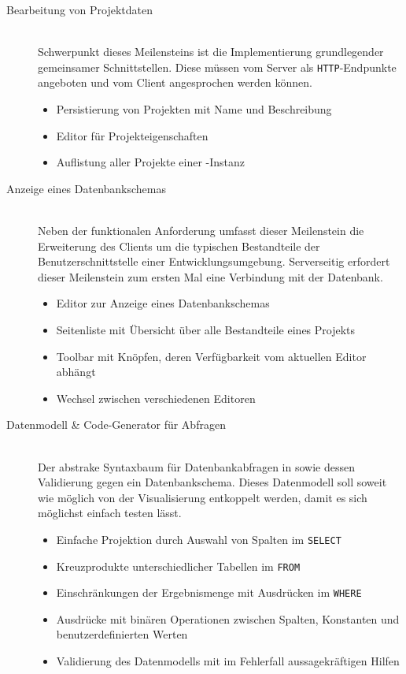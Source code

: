 \begin{description}
\item[Bearbeitung von Projektdaten] \hfill \\
  Schwerpunkt dieses Meilensteins ist die Implementierung grundlegender gemeinsamer Schnittstellen. Diese müssen vom Server als \texttt{HTTP}-Endpunkte angeboten und vom Client angesprochen werden können.
  \begin{itemize}[noitemsep]
  \item Persistierung von Projekten mit Name und Beschreibung
  \item Editor für Projekteigenschaften
  \item Auflistung aller Projekte einer \idename{}-Instanz
  \end{itemize}
  
\item [Anzeige eines Datenbankschemas] \hfill \\
  Neben der funktionalen Anforderung umfasst dieser Meilenstein die Erweiterung des Clients um die typischen Bestandteile der Benutzerschnittstelle einer Entwicklungsumgebung. Serverseitig erfordert dieser Meilenstein zum ersten Mal eine Verbindung mit der Datenbank.
  \begin{itemize}[noitemsep]
  \item Editor zur Anzeige eines Datenbankschemas
  \item Seitenliste mit Übersicht über alle Bestandteile eines Projekts
  \item Toolbar mit Knöpfen, deren Verfügbarkeit vom aktuellen Editor abhängt
  \item Wechsel zwischen verschiedenen Editoren
  \end{itemize}
  
\item [Datenmodell \& Code-Generator für Abfragen] \hfill \\
  Der abstrake Syntaxbaum für Datenbankabfragen in \idename{} sowie dessen Validierung gegen ein Datenbankschema. Dieses Datenmodell soll soweit wie möglich von der Visualisierung entkoppelt werden, damit es sich möglichst einfach testen lässt.
  \begin{itemize}[noitemsep]
  \item Einfache Projektion durch Auswahl von Spalten im \texttt{SELECT}
  \item Kreuzprodukte unterschiedlicher Tabellen im \texttt{FROM}
  \item Einschränkungen der Ergebnismenge mit Ausdrücken im \texttt{WHERE}
  \item Ausdrücke mit binären Operationen zwischen Spalten, Konstanten und benutzerdefinierten Werten
  \item Validierung des Datenmodells mit im Fehlerfall aussagekräftigen Hilfen
  \end{itemize}
  

\end{description}
